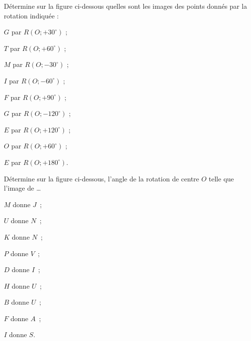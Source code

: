 

\begin{exercice}
Détermine sur la figure ci-dessous quelles sont les images des points donnés par la rotation indiquée :
\begin{colenumerate}{2}
 \item $G$ par $R(O ; + 30^\circ)$ ;
 \item $T$ par $R(O ; + 60^\circ)$ ;
 \item $M$ par $R(O ; - 30^\circ)$ ;
 \item $I$ par $R(O ; - 60^\circ)$ ;
 \item $F$ par $R(O ; + 90^\circ)$ ;
 \item $G$ par $R(O ; - 120^\circ)$ ;
 \item $E$ par $R(O; + 120^\circ)$ ;
 \item $O$ par $R(O ; + 60^\circ)$ ;
 \item $E$ par $R(O ; + 180^\circ)$.
 \end{colenumerate}
\begin{center}  \end{center}
\end{exercice}

\newpage

\vspace{-2.5cm}
\begin{exercice}
Détermine sur la figure ci-dessous, l'angle de la rotation de centre $O$ telle que l'image de \ldots
\begin{colenumerate}{3}
 \item $M$ donne $J$ ;
 \item $U$ donne $N$ ;
 \item $K$ donne $N$ ;
 \item $P$ donne $V$ ;
 \item $D$ donne $I$ ;
 \item $H$ donne $U$ ;
 \item $B$ donne $U$ ;
 \item $F$ donne $A$ ;
 \item $I$ donne $S$.
 \end{colenumerate}
\begin{center}  \end{center}
\end{exercice}



